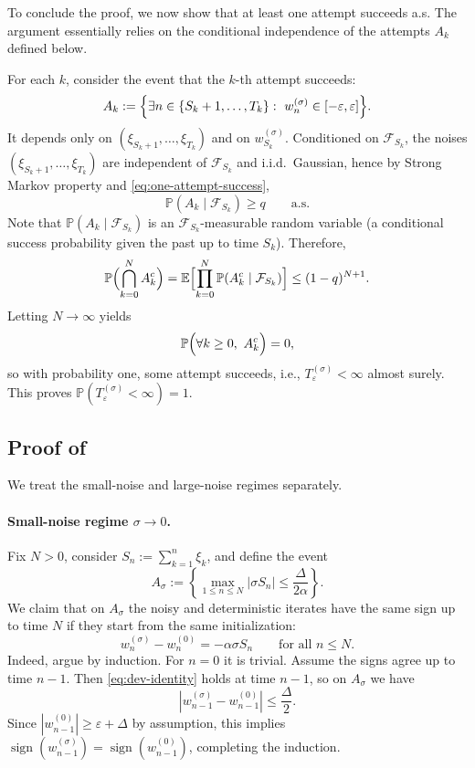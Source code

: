 \documentclass{article}
\theoremstyle{plain}
\theoremstyle{definition}
\theoremstyle{remark}
\newcommand{\E}{\mathbb{E}}
\newcommand{\PP}{\mathbb{P}}
\newcommand{\cF}{\mathcal{F}}
\newcommand{\stepsize}{\alpha}
\newcommand{\sign}{\operatorname{sign}}
\newcommand{\eps}{\varepsilon}
\begin{document}
\medskip
To conclude the proof, we now show that at least one attempt succeeds a.s. 
The argument essentially relies on the conditional independence of the attempts $A_k$ defined below. 

For each $k$, consider the event that the $k$-th attempt succeeds:
\[
  A_k := \Bigl\{\exists n\in\{S_k+1,\dots,T_k\}:\ w_n^{(\sigma)}\in[-\eps,\eps]\Bigr\}.
\]
It depends only on $(\xi_{S_k+1},\dots,\xi_{T_k})$ and on $w_{S_k}^{(\sigma)}$.
Conditioned on $\cF_{S_k}$, the noises $(\xi_{S_k+1},\dots,\xi_{T_k})$ are
independent of $\cF_{S_k}$ and i.i.d.\ Gaussian, hence by Strong Markov property and \eqref{eq:one-attempt-success},
\begin{equation}
\label{eq:conditional-success}
  \PP(A_k \mid \cF_{S_k}) \ge q \qquad \text{a.s.}
\end{equation}
Note that $\PP(A_k\mid \cF_{S_k})$ is an $\cF_{S_k}$-measurable random variable (a conditional success probability given the past 
up to time $S_k$). 
Therefore,
\[
  \PP\Bigl(\bigcap_{k=0}^N A_k^c\Bigr)
  = \E\Bigl[\prod_{k=0}^N \PP(A_k^c \mid \cF_{S_k})\Bigr]
  \le (1-q)^{N+1}.
\]
Letting $N\to\infty$ yields
\[
  \PP\Bigl(\forall k\ge 0,\ A_k^c\Bigr)=0,
\]
so with probability one, some attempt succeeds, i.e., $T_\eps^{(\sigma)}<\infty$
almost surely. This proves $\PP(T_\eps^{(\sigma)}<\infty)=1$.

\subsection{Proof of } \label{sec:small-large-noise-long-hitting}

We treat the small-noise and large-noise regimes separately.

\paragraph{Small-noise regime \texorpdfstring{$\sigma\to 0$}{sigma→0}.}
Fix $N>0$, consider $S_n := \sum_{k=1}^n \xi_k$, and define the event
\[
  A_\sigma
  := \left\{
       \max_{1\le n\le N}
       \bigl|\sigma S_n\bigr|
       \le \frac{\Delta}{2\stepsize}
     \right\}.
\]
We claim that on $A_\sigma$ the noisy 
and deterministic iterates have the same sign
up to time $N$ if they start from the same initialization:
\begin{equation}
\label{eq:dev-identity}
  w_n^{(\sigma)}-w_n^{(0)} = -\stepsize\sigma S_n
  \qquad \text{for all } n\le N.
\end{equation}
Indeed, argue by induction. For $n=0$ it is trivial.
Assume the signs agree up to time $n-1$. Then \eqref{eq:dev-identity} holds at time $n-1$,
so on $A_\sigma$ we have
\[
  |w_{n-1}^{(\sigma)}-w_{n-1}^{(0)}|
  \le \frac{\Delta}{2}.
\]
Since $|w_{n-1}^{(0)}|\ge \eps+\Delta$ by assumption, this implies
$\sign(w_{n-1}^{(\sigma)})=\sign(w_{n-1}^{(0)})$, completing the induction.
\end{document}
